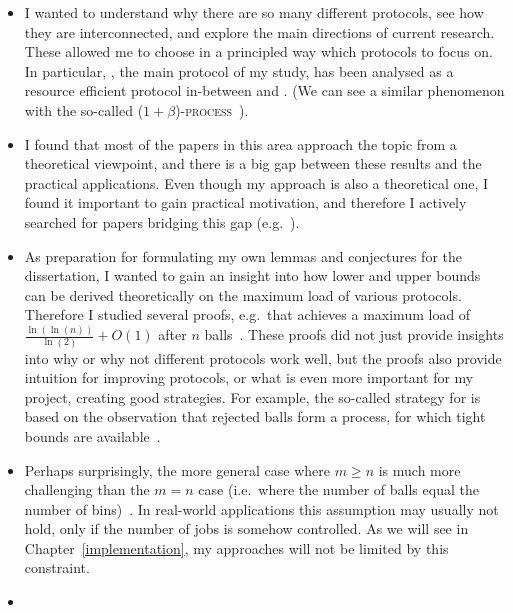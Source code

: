 \begin{itemize}
    \item 
    I wanted to understand why there are so many different protocols, see how they are interconnected, and explore the main directions of current research. These allowed me to choose in a principled way which protocols to focus on. In particular, \TwoThinning, the main protocol of my study, has been analysed as a resource efficient protocol in-between \OneChoice and \TwoChoice. (We can see a similar phenomenon with the so-called \textsc{($1+\beta$)-process}~\cite{peres2015oneplusbeta}).
    \item
    I found that most of the papers in this area approach the topic from a theoretical viewpoint, and there is a big gap between these results and the practical applications. Even though my approach is also a theoretical one, I found it important to gain practical motivation, and therefore I actively searched for papers bridging this gap (e.g.~\cite{wang2017twochoicerouting}).
    \item
    As preparation for formulating my own lemmas and conjectures for the dissertation, I wanted to gain an insight into how lower and upper bounds can be derived theoretically on the maximum load of various protocols. Therefore I studied several proofs, e.g.\ that \TwoChoice achieves a maximum load of $\frac{\ln(\ln(n))}{\ln(2)} + O(1)$ after $n$ balls~\cite{azar1999twochoice}. These proofs did not just provide insights into why or why not different protocols work well, but the proofs also provide intuition for improving protocols, or what is even more important for my project, creating good strategies. For example, the so-called \Threshold strategy for \TwoThinning is based on the observation that rejected balls form a \OneChoice process, for which tight bounds are available~\cite{feldheim2021thinning}.
    \item
    Perhaps surprisingly, the more general case where $m\geq n$ is much more challenging than the $m=n$ case (i.e.\ where the number of balls equal the number of bins)~\cite{berenbrink2006heavilyloaded}. In real-world applications this assumption may usually not hold, only if the number of jobs is somehow controlled. As we will see in Chapter~\ref{implementation}, my approaches will not be limited by this constraint.
    \iffalse %
    \item

\end{itemize}
